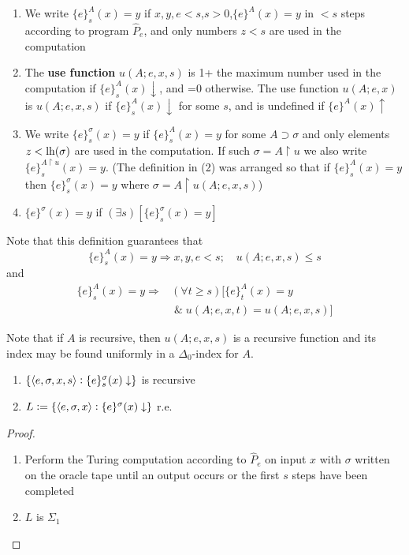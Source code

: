 \documentclass[11pt]{article}
\begin{document}
\begin{definition}[]
\begin{enumerate}
\item We write \(\{e\}_s^A(x)=y\) if \(x,y,e<s\),\(s>0\),\(\{e\}^A(x)=y\) in
\(<s\) steps according to program \(\widehat{P}_e\), and only numbers
\(z<s\) are used in the computation
\item The \textbf{use function} \(u(A;e,x,s)\) is 1+ the maximum number used in the
computation if \(\{e\}^A_s(x)\downarrow\), and =0 otherwise. The use
function \(u(A;e,x)\) is \(u(A;e,x,s)\) if \(\{e\}_s^A(x)\downarrow\) for
some \(s\), and is undefined if \(\{e\}^A(x)\uparrow\)
\item We write \(\{e\}_s^\sigma(x)=y\) if \(\{e\}_s^A(x)=y\) for some
\(A\supset\sigma\) and only elements \(z<\operatorname{lh}(\sigma)\) are used in the
computation. If such \(\sigma=A\restriction u\) we also write
\(\{e\}_s^{A\restriction u}(x)=y\). (The definition in (2) was arranged
so that if \(\{e\}_s^A(x)=y\) then \(\{e\}_s^\sigma(x)=y\) where
\(\sigma=A\restriction u(A;e,x,s)\))
\item \(\{e\}^\sigma(x)=y\) if \((\exists s)[\{e\}_s^\sigma(x)=y]\)
\end{enumerate}
\end{definition}

Note that this definition guarantees that
\begin{equation}
\{e\}_s^A(x)=y\Longrightarrow x,y,e<s;\quad u(A;e,x,s)\le s\label{eq3.1.1}
\end{equation}
and
\begin{align}
\{e\}_s^A(x)=y\Longrightarrow&(\forall t\ge s)[\{e\}_t^A(x)=y\\
&\;\&\;u(A;e,x,t)=u(A;e,x,s)]\nonumber\label{eq3.1.2}
\end{align}

Note that if \(A\) is recursive, then \(u(A;e,x,s)\) is a recursive function
and its index may be found uniformly in a \(\Delta_0\)-index for \(A\).

\begin{theorem}
\begin{enumerate}
\item \(\{\langle e,\sigma,x,s\rangle:\{e\}_s^\sigma(x)\downarrow\}\) is recursive
\item \(L:=\{\langle e,\sigma,x\rangle:\{e\}^\sigma(x)\downarrow\}\) r.e.
\end{enumerate}
\end{theorem}

\begin{proof}
\begin{enumerate}
\item Perform the Turing computation according to \(\widehat{P}_e\) on input
\(x\) with \(\sigma\) written on the oracle tape until an output occurs or the
first \(s\) steps have been completed
\item \(L\) is \(\Sigma_1\)
\end{enumerate}
\end{proof}
\end{document}
